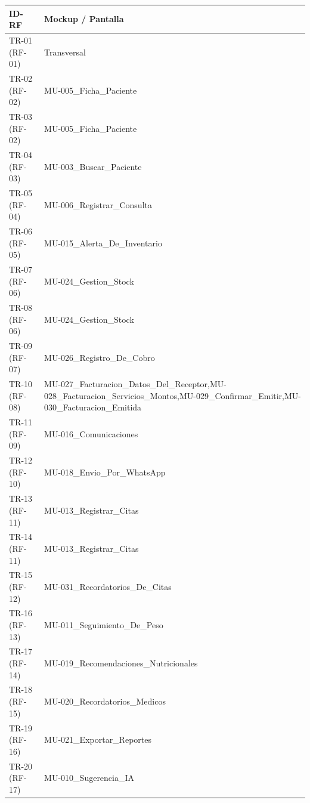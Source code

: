 \documentclass[
]{article}
\newcounter{none} %
\begin{document}
{\def\LTcaptype{none} %
\begin{longtable}[]{|
  >{\centering\arraybackslash}p{}|
  >{\raggedright\arraybackslash}p{}|}
\hline
\begin{minipage}[b]{\linewidth}\centering
\textbf{ID-RF}
\end{minipage} & \begin{minipage}[b]{\linewidth}\raggedright
\textbf{Mockup / Pantalla}
\end{minipage} \\
\hline
\endhead
\hline
\endlastfoot
TR-01 (RF-01) & Transversal \\
\hline
TR-02 (RF-02) & MU-005\_Ficha\_Paciente \\
\hline
TR-03 (RF-02) & MU-005\_Ficha\_Paciente \\
\hline
TR-04 (RF-03) & MU-003\_Buscar\_Paciente \\
\hline
TR-05 (RF-04) & MU-006\_Registrar\_Consulta \\
\hline
TR-06 (RF-05) & MU-015\_Alerta\_De\_Inventario \\
\hline
TR-07 (RF-06) & MU-024\_Gestion\_Stock \\
\hline
TR-08 (RF-06) & MU-024\_Gestion\_Stock \\
\hline
TR-09 (RF-07) & MU-026\_Registro\_De\_Cobro \\
\hline
TR-10 (RF-08) & MU-027\_Facturacion\_Datos\_Del\_Receptor,MU-028\_Facturacion\_Servicios\_Montos,MU-029\_Confirmar\_Emitir,MU-030\_Facturacion\_Emitida \\
\hline
TR-11 (RF-09) & MU-016\_Comunicaciones \\
\hline
TR-12 (RF-10) & MU-018\_Envio\_Por\_WhatsApp \\
\hline
TR-13 (RF-11) & MU-013\_Registrar\_Citas \\
\hline
TR-14 (RF-11) & MU-013\_Registrar\_Citas \\
\hline
TR-15 (RF-12) & MU-031\_Recordatorios\_De\_Citas \\
\hline
TR-16 (RF-13) & MU-011\_Seguimiento\_De\_Peso \\
\hline
TR-17 (RF-14) & MU-019\_Recomendaciones\_Nutricionales \\
\hline
TR-18 (RF-15) & MU-020\_Recordatorios\_Medicos \\
\hline
TR-19 (RF-16) & MU-021\_Exportar\_Reportes \\
\hline
TR-20 (RF-17) & MU-010\_Sugerencia\_IA \\

\end{longtable}}
\end{document}
